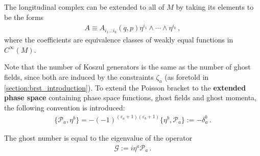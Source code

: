 {        The longitudinal complex can be extended to all of $M$ by taking its elements to be the forms
        \begin{gather}
            A \equiv A_{i_1\ldots i_k}(q,p)\eta^{i_1}\wedge\cdots\wedge\eta^{i_k}\,,
        \end{gather}
        where the coefficients are equivalence classes of weakly equal functions in $C^\infty(M)$.
    }


    Note that the number of Koszul generators is the same as the number of ghost fields, since both are induced by the constraints $\zeta_a$ (as foretold in \cref{section:brst_introduction}). To extend the Poisson bracket to the \textbf{extended phase space} containing phase space functions, ghost fields and ghost momenta, the following convention is introduced:
    \begin{gather}
        \{\mathcal{P}_a,\eta^b\} = -(-1)^{(\varepsilon_a+1)(\varepsilon_b+1)}\{\eta^b,\mathcal{P}_a\} := -\delta_a^b\,.
    \end{gather}


    \begin{property}
        The ghost number is equal to the eigenvalue of the operator
        \begin{gather}
            \label{constraint:ghost_number}
            \mathcal{G}:=i\eta^a\mathcal{P}_a\,.
        \end{gather}
    \end{property}

